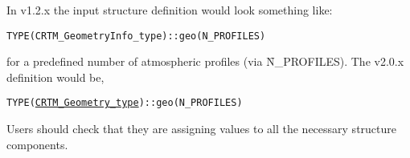 In v1.2.x the input structure definition would look something like:
\begin{alltt}
  TYPE(CRTM_GeometryInfo_type) :: geo(N_PROFILES)\end{alltt}
for a predefined number of atmospheric profiles (via \f{N\_PROFILES}). The v2.0.x definition would be,
\begin{alltt}
  TYPE(\hyperref[sec:geometry_structure]{CRTM_Geometry_type}) :: geo(N_PROFILES)\end{alltt}
Users should check that they are assigning values to all the necessary structure components. 
